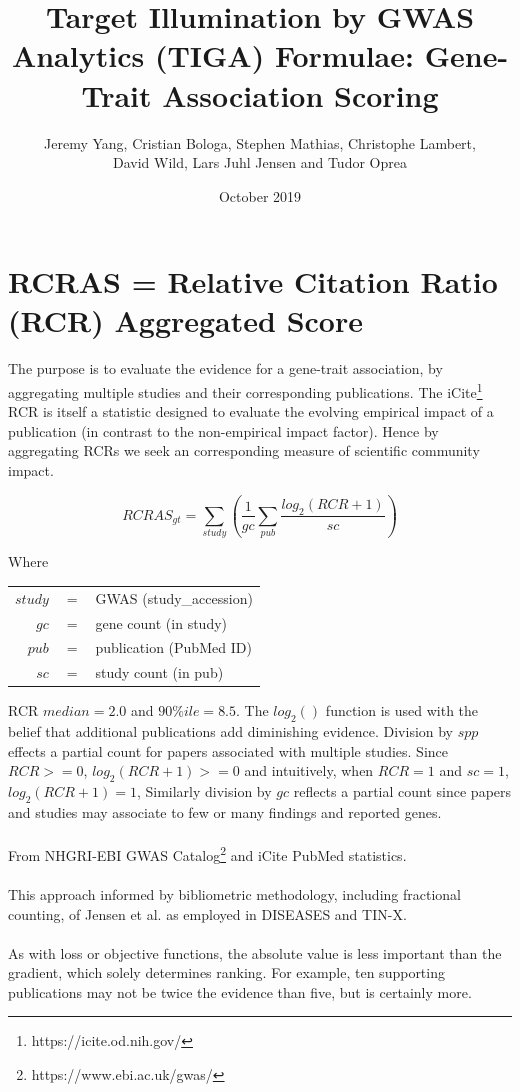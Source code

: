 \documentclass[12pt]{extarticle}
\title{Target Illumination by GWAS Analytics (TIGA) Formulae: Gene-Trait Association Scoring}
\author{Jeremy Yang, Cristian Bologa, Stephen Mathias, Christophe Lambert, \\
David Wild, Lars Juhl Jensen  and Tudor Oprea}
\date{October 2019}
\begin{document}
\maketitle

\section{RCRAS =  Relative Citation Ratio (RCR) Aggregated Score}

The purpose is to evaluate the evidence for a gene-trait association, by aggregating multiple studies and their corresponding publications. The iCite\footnote{https://icite.od.nih.gov/} RCR\cite{rcr} is itself a statistic designed to evaluate the evolving empirical impact of a publication (in contrast to the non-empirical impact factor). Hence by aggregating RCRs we seek an corresponding measure of scientific community impact.
 
\begin{equation} RCRAS_{gt} = \sum_{study} \left(\frac{1}{gc} \sum_{pub} \frac{log_{2}(RCR + 1)}{sc}\right)
\end{equation}

Where \\
\begin{center}
\begin{tabular}{ r c l }
    $study$ & $=$ & GWAS (study\_accession) \\
	$gc$ & $=$ & gene count (in study)	\\
	$pub$ & $=$ & publication (PubMed ID)	\\
	$sc$ & $=$ & study count (in pub)	\\
\end{tabular}
\end{center}

RCR $median = 2.0$ and $90\%ile = 8.5$. The $log_{2}()$ function is used with the belief that additional publications add diminishing evidence. Division by $spp$ effects a partial count for papers associated with multiple studies. Since $RCR >= 0$, $log_{2}(RCR + 1) >= 0$ and intuitively, when $RCR = 1$ and $sc = 1$, $log_{2}(RCR + 1) = 1$,  Similarly division by $gc$ reflects a partial count since papers and studies may associate to few or many findings and reported genes. \\
\\
From NHGRI-EBI GWAS Catalog\footnote{https://www.ebi.ac.uk/gwas/} and iCite PubMed statistics. \\
\\
This approach informed by bibliometric methodology, including fractional counting, of Jensen et al. as employed in DISEASES\cite{diseases} and TIN-X\cite{tinx}. \\
\\
As with loss or objective functions, the absolute value is less important than the gradient, which solely determines ranking. For example, ten supporting publications may not be twice the evidence than five, but is certainly more.
\end{document}

